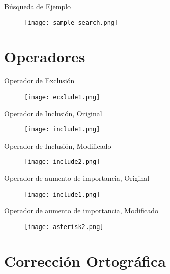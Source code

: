 \documentclass{beamer}
\begin{document}
\begin{frame}{Búsqueda de Ejemplo}
    \begin{figure}[h]
        \texttt{[image: sample\_search.png]}
    \end{figure}
\end{frame}

\section{Operadores}

\begin{frame}{Operador de Exclusión}
    \begin{figure}[h]
        \texttt{[image: ecxlude1.png]}
    \end{figure}
\end{frame}

\begin{frame}{Operador de Inclusión, Original}
    \begin{figure}[h]
        \texttt{[image: include1.png]}
    \end{figure}
\end{frame}

\begin{frame}{Operador de Inclusión, Modificado}
    \begin{figure}[h]
        \texttt{[image: include2.png]}
    \end{figure}
\end{frame}


\begin{frame}{Operador de aumento de importancia, Original}
    \begin{figure}
        \texttt{[image: include1.png]}
    \end{figure}
\end{frame}

\begin{frame}{Operador de aumento de importancia, Modificado}
    \begin{figure}
        \texttt{[image: asterisk2.png]}
    \end{figure}
\end{frame}

\section{Corrección Ortográfica}
\end{document}
